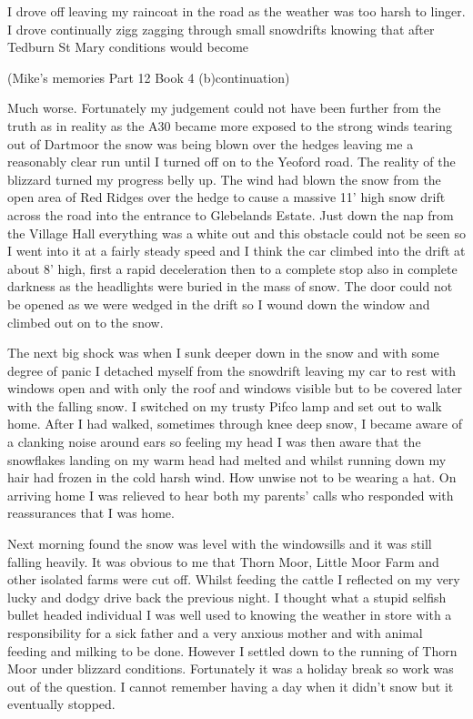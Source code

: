 I drove off leaving my raincoat in the road as the weather was too harsh to
linger. I drove continually zigg zagging through small snowdrifts knowing that
after Tedburn St Mary conditions would become

(Mike's memories Part 12 Book 4 (b)continuation)

Much worse.  Fortunately my judgement could not have been further from the truth
as in reality as the A30 became more exposed to the strong winds tearing out of
Dartmoor the snow was being blown over the hedges leaving me a reasonably clear
run until I turned off on to the Yeoford road.  The reality of the blizzard
turned my progress belly up.  The wind had blown the snow from the open area of
Red Ridges over the hedge to cause a massive 11' high snow drift across the
road into the entrance to Glebelands Estate.  Just down the nap from the
Village Hall everything was a white out and this obstacle could not be seen so
I went into it at a fairly steady speed and I think the car climbed into the
drift at about 8' high, first a rapid deceleration then to a complete stop also
in complete darkness as the headlights were buried in the mass of snow.  The
door could not be opened as we were wedged in the drift so I wound down the
window and climbed out on to the snow.

The next big shock was when I sunk deeper down in the snow and with some degree
of panic I detached myself from the snowdrift leaving my car to rest with
windows open and with only the roof and windows visible but to be covered later
with the falling snow.  I switched on my trusty Pifco lamp and set out to walk
home.  After I had walked, sometimes through knee deep snow, I became aware of
a clanking noise around ears so feeling my head I was then aware that the
snowflakes landing on my warm head had melted and whilst running down my hair
had frozen in the cold harsh wind.  How unwise not to be wearing a hat.  On
arriving home I was relieved to hear both my parents' calls who responded with
reassurances that I was home.

Next morning found the snow was level with the windowsills and it was still
falling heavily.  It was obvious to me that Thorn Moor, Little Moor Farm and
other isolated farms were cut off.  Whilst feeding the cattle I reflected on my
very lucky and dodgy drive back the previous night.  I thought what a stupid
selfish bullet headed individual I was well used to knowing the weather in
store with a responsibility for a sick father and a very anxious mother and
with animal feeding and milking to be done.  However I settled down to the
running of Thorn Moor under blizzard conditions.  Fortunately it was a holiday
break so work was out of the question.  I cannot remember having a day when it
didn't snow but it eventually stopped.

